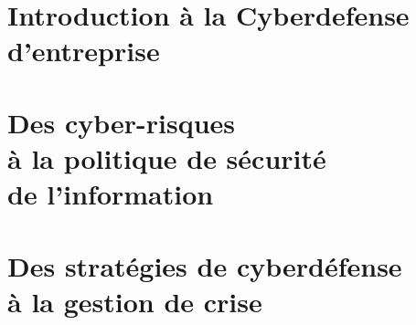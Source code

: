 

\part[Cyber-généralités]{Introduction à la Cyberdefense d'entreprise}



\part[Risques et Mesures de sécurité]{Des cyber-risques \\à la politique de sécurité \\de l'information}




\part[Sécurité opérationnelle]{Des stratégies de cyberdéfense \\à la gestion de crise}

